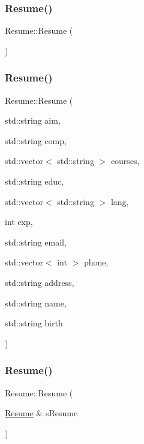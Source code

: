 \subsubsection{\texorpdfstring{Resume()}{Resume()}\hspace{0.1cm}{\footnotesize\ttfamily [1/4]}}
{\footnotesize\ttfamily Resume\+::\+Resume (\begin{DoxyParamCaption}{ }\end{DoxyParamCaption})}

\hypertarget{class_resume_a92600ef21027117b53ab9d3fdb6705f5}{}\label{class_resume_a92600ef21027117b53ab9d3fdb6705f5} 
\subsubsection{\texorpdfstring{Resume()}{Resume()}\hspace{0.1cm}{\footnotesize\ttfamily [2/4]}}
{\footnotesize\ttfamily Resume\+::\+Resume (\begin{DoxyParamCaption}\item[{std\+::string}]{aim,  }\item[{std\+::string}]{comp,  }\item[{std\+::vector$<$ std\+::string $>$}]{courses,  }\item[{std\+::string}]{educ,  }\item[{std\+::vector$<$ std\+::string $>$}]{lang,  }\item[{int}]{exp,  }\item[{std\+::string}]{email,  }\item[{std\+::vector$<$ int $>$}]{phone,  }\item[{std\+::string}]{address,  }\item[{std\+::string}]{name,  }\item[{std\+::string}]{birth }\end{DoxyParamCaption})}

\hypertarget{class_resume_a6fc2de3d11d4650dd7720c344386c8a2}{}\label{class_resume_a6fc2de3d11d4650dd7720c344386c8a2} 
\subsubsection{\texorpdfstring{Resume()}{Resume()}\hspace{0.1cm}{\footnotesize\ttfamily [3/4]}}
{\footnotesize\ttfamily Resume\+::\+Resume (\begin{DoxyParamCaption}\item[{\hyperlink{class_resume}{Resume} \&}]{s\+Resume }\end{DoxyParamCaption})}

